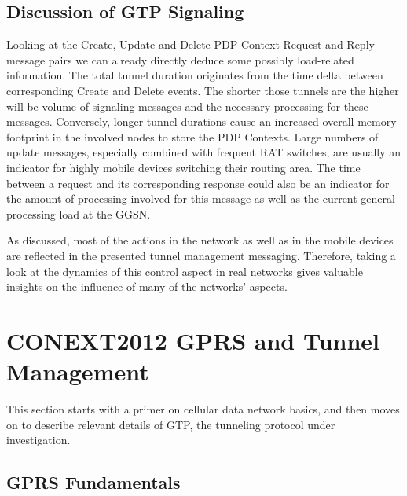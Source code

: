 \subsection{Discussion of GTP Signaling}

Looking at the Create, Update and Delete PDP Context Request and Reply message pairs we can already directly deduce some possibly load-related information. The total tunnel duration originates from the time delta between corresponding Create and Delete events. The shorter those tunnels are the higher will be volume of signaling messages and the necessary processing for these messages. Conversely, longer tunnel durations cause an increased overall memory footprint in the involved nodes to store the \ac{PDP} Contexts. Large numbers of update messages, especially combined with frequent \ac{RAT} switches, are usually an indicator for highly mobile devices switching their routing area. 
The time between a request and its corresponding response could also be an indicator for the amount of processing involved for this message as well as the current general processing load at the \ac{GGSN}.

As discussed, most of the actions in the network as well as in the mobile devices are reflected in the presented tunnel management messaging. Therefore, taking a look at the dynamics of this control aspect in real networks gives valuable insights on the influence of many of the networks' aspects.




\section{CONEXT2012 GPRS and Tunnel Management}
\label{sec:gtp-CONEXT}
\acresetall
This section starts with a primer on cellular data network basics, and then moves on to describe relevant details of \ac{GTP}, the tunneling protocol under investigation.



\subsection{\acs{GPRS} Fundamentals}

